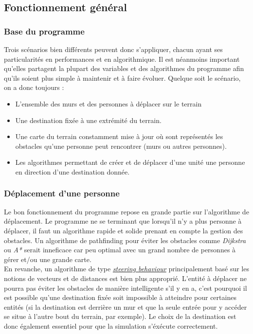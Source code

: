 \documentclass[11pt]{article} %
\begin{document}
\subsection{Fonctionnement général}
\subsubsection{Base du programme}
Trois scénarios bien différents peuvent donc s'appliquer, chacun ayant ses particularités en performances et en algorithmique.
Il est néanmoins important qu'elles partagent la plupart des variables et des algorithmes du programme afin qu'ils soient plus simple à maintenir et à faire évoluer. Quelque soit le scénario, on a donc toujours : 
\begin{itemize}
	
	\item L'ensemble des murs et des personnes à déplacer sur le terrain 
	\item Une destination fixée à une extrémité du terrain.
	\item Une carte du terrain constamment mise à jour où sont représentés les obstacles qu'une personne peut rencontrer (murs ou 			autres personnes).
	\item Les algorithmes permettant de créer et de déplacer d'une unité une personne en direction d'une destination donnée.
\end{itemize}

\subsubsection{Déplacement d'une personne}
Le bon fonctionnement du programme repose en grande partie sur l'algorithme de déplacement. Le programme ne se terminant que lorsqu'il n'y a plus personne à déplacer, il faut un algorithme rapide et solide prenant en compte la gestion des obstacles. Un algorithme de pathfinding pour éviter les obstacles comme \textit{Dijkstra} ou \textit{A*} serait inneficace car peu optimal avec un grand nombre de personnes à gérer et/ou une grande carte. \\
En revanche, un algorithme de type \href{https://gamedevelopment.tutsplus.com/tutorials/understanding-steering-behaviors-seek--gamedev-849}{\textit{steering behaviour}} principalement basé sur les notions de vecteurs et de distances est bien plus approprié.
L'entité à déplacer ne pourra pas éviter les obstacles de manière intelligente s'il y en a, c'est pourquoi il est possible qu'une destination fixée soit impossible à atteindre pour certaines entités (si la destination est derrière un mur et que la seule entrée pour y accéder se situe à l'autre bout du terrain, par exemple). Le choix de la destination est donc également essentiel pour que la simulation s'éxécute correctement.
\end{document}
